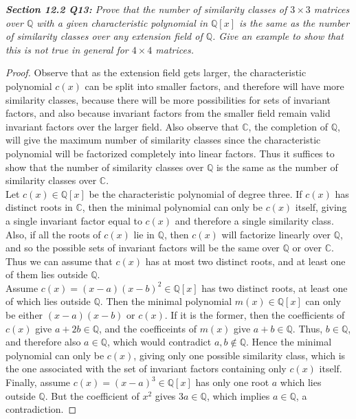 \documentclass{article}
\begin{document}
\it \textbf{Section 12.2 Q13:} Prove that the number of similarity
  classes of $3\times3$ matrices over $\mathbb{Q}$ with a given
  characteristic polynomial in $\mathbb{Q}[x]$ is the same as the number of
  similarity classes over any extension field of $\mathbb{Q}$. Give an
  example to show that this is not true in general for $4\times4$ matrices.

  \begin{proof}
    Observe that as the extension field gets larger, the characteristic
    polynomial $c(x)$ can be split into smaller factors, and therefore will
    have more similarity classes, because there will be more possibilities
    for sets of invariant factors, and also because invariant factors from
    the smaller field remain valid invariant factors over the larger
    field.  Also observe that $\mathbb{C}$, the completion of
    $\mathbb{Q}$, will give the maximum number of similarity classes
    since the characteristic polynomial will be factorized completely
    into linear factors. Thus it suffices to show that the number of
    similarity classes over $\mathbb{Q}$ is the same as the number of
    similarity classes over $\mathbb{C}$. \\

    Let $c(x)\in\mathbb{Q}[x]$ be the characteristic polynomial of degree
    three. If $c(x)$ has distinct roots in $\mathbb{C}$, then the minimal
    polynomial can only be $c(x)$ itself, giving a single invariant factor
    equal to $c(x)$ and therefore a single similarity class. Also, if all
    the roots of $c(x)$ lie in $\mathbb{Q}$, then $c(x)$ will factorize
    linearly over $\mathbb{Q}$, and so the possible sets of invariant
    factors will be the same over $\mathbb{Q}$ or over $\mathbb{C}$. Thus
    we can assume that $c(x)$ has at most two distinct roots, and at least
    one of them lies outside $\mathbb{Q}$. \\

    Assume $c(x)=(x-a)(x-b)^2\in\mathbb{Q}[x]$ has two distinct roots, at
    least one of which lies outside $\mathbb{Q}$. Then the minimal
    polynomial $m(x)\in\mathbb{Q}[x]$ can only be either $(x-a)(x-b)$ or
    $c(x)$. If it is the former, then the coefficients of $c(x)$
    give $a+2b\in\mathbb{Q}$, and the coefficeints of $m(x)$ give
    $a+b\in\mathbb{Q}$. Thus, $b\in\mathbb{Q}$, and therefore also
    $a\in\mathbb{Q}$, which would contradict $a,b\not\in\mathbb{Q}$. Hence
    the minimal polynomial can only be $c(x)$, giving only one possible
    similarity class, which is the one associated with the set of invariant
    factors containing only $c(x)$ itself. \\

    Finally, assume $c(x)=(x-a)^3\in\mathbb{Q}[x]$ has only one root $a$
    which lies outside $\mathbb{Q}$. But the coefficient of $x^2$ gives
    $3a\in\mathbb{Q}$, which implies $a\in\mathbb{Q}$, a contradiction.
  \end{proof}
\end{document}
